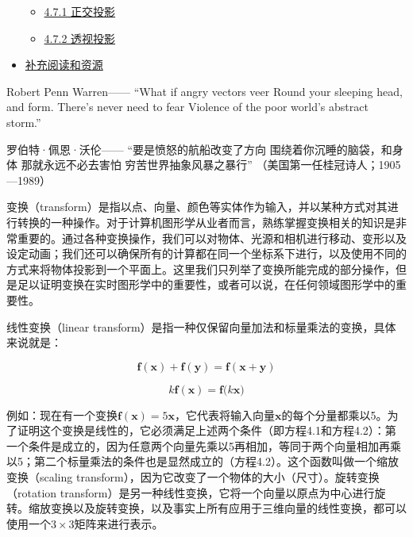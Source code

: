 \documentclass[
  paper=a4,
  ,captions=tableheading
]{scrartcl}
\providecommand{\tightlist}{%
  \setlength{\itemsep}{0pt}\setlength{\parskip}{0pt}}
\renewenvironment{quote}{\begin{customblockquote}\list{}{\rightmargin=0em\leftmargin=0em}%
\item\relax\color{blockquote-text}\ignorespaces}{\unskip\unskip\endlist\end{customblockquote}}
\begin{document}
\begin{itemize}
        \begin{itemize}
          \tightlist
          \item
                \hyperref[471-ux6b63ux4ea4ux6295ux5f71]{4.7.1 正交投影}
          \item
                \hyperref[472-ux900fux89c6ux6295ux5f71]{4.7.2 透视投影}
        \end{itemize}
  \item
        \hyperref[ux8865ux5145ux9605ux8bfbux548cux8d44ux6e90]{补充阅读和资源}
\end{itemize}

\begin{quote}
  Robert Penn Warren------ ``What if angry vectors veer Round your
  sleeping head, and form.  There's never need to fear  Violence of the
  poor world's abstract storm.''
\end{quote}

\begin{quote}
  罗伯特·佩恩·沃伦------ ``要是愤怒的航船改变了方向
  围绕着你沉睡的脑袋，和身体 那就永远不必去害怕 穷苦世界抽象风暴之暴行''
  （美国第一任桂冠诗人；1905---1989）
\end{quote}

变换（transform）是指以点、向量、颜色等实体作为输入，并以某种方式对其进行转换的一种操作。对于计算机图形学从业者而言，熟练掌握变换相关的知识是非常重要的。通过各种变换操作，我们可以对物体、光源和相机进行移动、变形以及设定动画；我们还可以确保所有的计算都在同一个坐标系下进行，以及使用不同的方式来将物体投影到一个平面上。这里我们只列举了变换所能完成的部分操作，但是足以证明变换在实时图形学中的重要性，或者可以说，在任何领域图形学中的重要性。

线性变换（linear
transform）是指一种仅保留向量加法和标量乘法的变换，具体来说就是：

\[
  \mathbf{f(x)} + \mathbf{f(y)} = \mathbf{f(x + y)} \tag{4.1}
\]

\[
  k \mathbf{f(x)} = \mathbf{f(} k \mathbf{x)}  \tag{4.2}
\]

例如：现在有一个变换\(\mathbf{f(x)} = 5\mathbf{x}\)，它代表将输入向量\(\mathbf{x}\)的每个分量都乘以5。为了证明这个变换是线性的，它必须满足上述两个条件（即方程4.1和方程4.2）：第一个条件是成立的，因为任意两个向量先乘以5再相加，等同于两个向量相加再乘以5；第二个标量乘法的条件也是显然成立的（方程4.2）。这个函数叫做一个缩放变换（scaling
transform），因为它改变了一个物体的大小（尺寸）。旋转变换（rotation
transform）是另一种线性变换，它将一个向量以原点为中心进行旋转。缩放变换以及旋转变换，以及事实上所有应用于三维向量的线性变换，都可以使用一个\(3 \times 3\)矩阵来进行表示。
\end{document}
